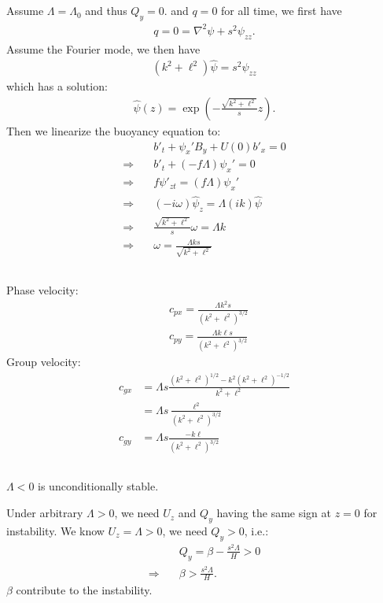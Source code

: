 \documentclass[11pt,letterpaper]{book}
\theoremstyle{definition}
\newcommand{\thus}{\Rightarrow \quad }
\begin{document}
\subsection{}
Assume $\Lambda = \Lambda_0$ and thus $Q_y = 0$. and $q = 0$ for all time, we first have
\begin{align*}
q = 0 = \nabla^2\psi+s^2\psi_{zz}.
\end{align*}
Assume the Fourier mode, we then have
\begin{align*}
(k^2+\ell^2)\hat{\psi} = s^2\hat{\psi}_{zz}
\end{align*}
which has a solution:
\begin{align*}
\hat\psi(z) = \exp\left(-\frac{\sqrt{k^2+\ell^2}}{s}z\right).
\end{align*}
Then we linearize the buoyancy equation to:
\begin{align*}
&b'_t+\psi_x'B_y+U(0)b'_x = 0\\
\thus& b'_t+(-f\Lambda)\psi_x' = 0\\
\thus& f\psi'_{zt}=(f\Lambda)\psi_x'\\
\thus& (-i\omega)\hat\psi_z=\Lambda(ik)\hat\psi\\
\thus& \frac{\sqrt{k^2+\ell^2}}{s}\omega=\Lambda k\\
\thus& \omega=\frac{\Lambda k s}{\sqrt{k^2+\ell^2}}
\end{align*}

\subsection{}
Phase velocity:
\begin{align*}
&c_{px} = \frac{\Lambda k^2 s}{(k^2+\ell^2)^{3/2}}\\
&c_{py} = \frac{\Lambda k\ell s}{(k^2+\ell^2)^{3/2}}
\end{align*}
Group velocity:
\begin{align*}
c_{gx} &= \Lambda s\frac{(k^2+\ell^2)^{1/2}-k^2(k^2+\ell^2)^{-1/2}}{{k^2+\ell^2}}\\
&= \Lambda s\frac{\ell^2}{(k^2+\ell^2)^{3/2}}\\
c_{gy} &= \Lambda s\frac{-k\ell}{(k^2+\ell^2)^{3/2}}
\end{align*}

\subsection{}
$\Lambda<0$ is unconditionally stable.

Under arbitrary $\Lambda>0$, we need $U_z$ and $Q_y$ having the same sign at $z=0$ for instability. We know $U_z = \Lambda>0$, we need $Q_y>0$, i.e.:
\begin{align*}
&Q_y = \beta-\frac{s^2\Lambda}{H}>0\\
\thus &\beta>\frac{s^2\Lambda}{H}.
\end{align*}
$\beta$ contribute to the instability.
\end{document}
